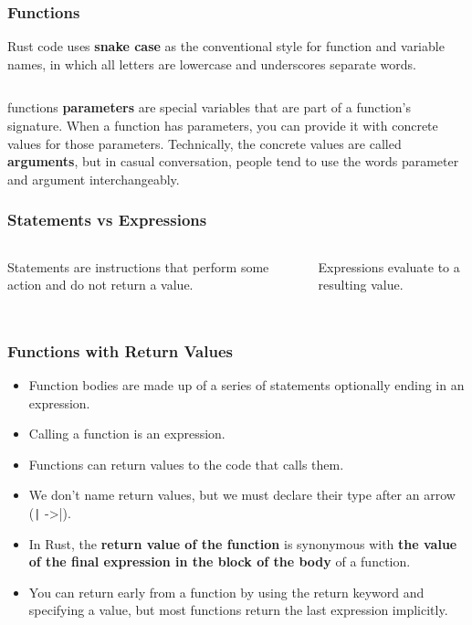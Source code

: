 \documentclass{beamer}
\begin{document}
	\begin{frame}[fragile]
		\frametitle{Functions}
		Rust code uses \textbf{snake case} as the conventional style for function and variable names, in which all letters are lowercase and underscores separate words.
		
		\inputminted{rust}{./code/function.rs}
		
		\tiny
		functions \textbf{parameters} are special variables that are part of a function’s signature. When a function has parameters, you can provide it with concrete values for those parameters. Technically, the concrete values are called \textbf{arguments}, but in casual conversation, people tend to use the words parameter and argument interchangeably.
		
	\end{frame}
	
	\begin{frame}[fragile]
		\frametitle{Statements vs Expressions}
		\begin{columns}
			\begin{block}{Statements}
				are instructions that perform some action and do not return a value.
			\end{block}
			\begin{block}{Expressions}
				evaluate to a resulting value.
			\end{block}
		\end{columns}
		\inputminted{rust}{./code/statements-expressions.rs}
	\end{frame}
	
	
	\begin{frame}[fragile]
		\frametitle{Functions with Return Values}
		\begin{itemize}
			\item Function bodies are made up of a series of statements optionally ending in an expression.
			\item Calling a function is an expression.
			\item Functions can return values to the code that calls them. 
			\item We don’t name return values, but we must declare their type after an arrow (\texttt| ->|). 
			\item In Rust, the \textbf{return value of the function} is synonymous with \textbf{the value of the final expression in the block of the body} of a function. 
			\item You can return early from a function by using the return keyword and specifying a value, but most functions return the last expression implicitly.
		\end{itemize}
	\end{frame}
	
\end{document}
